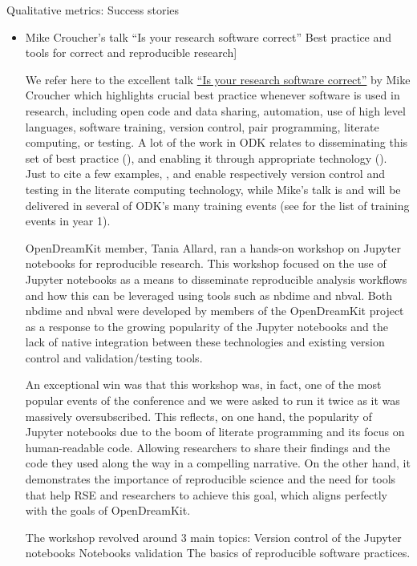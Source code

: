 \begin{Aim 1}
\begin{Aim 2}
Qualitative metrics: Success stories
\begin{itemize}
\item Mike Croucher's talk ``Is your research software correct''
Best practice and tools for correct and reproducible research]
         
         We refer here to the excellent talk
\href{https://mikecroucher.github.io/MLPM_talk/}{``Is your research software correct''} by Mike Croucher which highlights crucial best 
practice whenever software is used in research, including open code and data sharing, automation, use of high level languages, software 
training, version control, pair programming, literate computing, or testing. A lot of the work in ODK relates to disseminating this set of 
best practice (), and enabling it through appropriate technology ().  Just to cite a few examples, 
, and  enable respectively version control and testing in the \Jupyter 
literate computing technology, while Mike's talk is and will be delivered in several of ODK's many training events (see 
 for the list of training events in year 1).


 OpenDreamKit member, Tania Allard, ran a hands-on workshop on Jupyter notebooks for reproducible research. This workshop focused on the use of Jupyter notebooks as a means to disseminate reproducible analysis workflows and how this can be leveraged using tools such as nbdime and nbval. Both nbdime and nbval were developed by members of the OpenDreamKit project as a response to the growing popularity of the Jupyter notebooks and the lack of native integration between these technologies and existing version control and validation/testing tools.

An exceptional win was that this workshop was, in fact, one of the most popular events of the conference and we were asked to run it twice as it was massively oversubscribed. This reflects, on one hand, the popularity of Jupyter notebooks due to the boom of literate programming and its focus on human-readable code. Allowing researchers to share their findings and the code they used along the way in a compelling narrative. On the other hand, it demonstrates the importance of reproducible science and the need for tools that help RSE and researchers to achieve this goal, which aligns perfectly with the goals of OpenDreamKit.

The workshop revolved around 3 main topics:
    Version control of the Jupyter notebooks
    Notebooks validation
    The basics of reproducible software practices.
    

\end{itemize}
\end{Aim 2}
\end{Aim 1}

